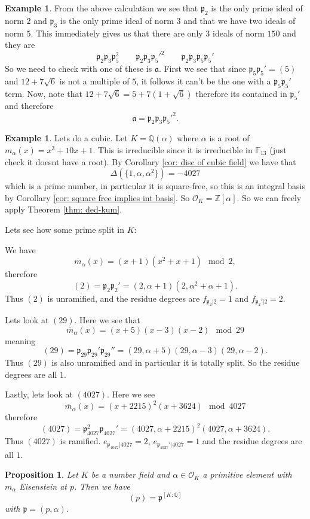 \documentclass[11pt,a4paper]{report}
\theoremstyle{plain}
\newtheorem{prop}[subsection]{Proposition}
\theoremstyle{definition}
\newtheorem{exmp}[subsection]{Example}
\theoremstyle{definition}
\newcommand{\ZZ}{\mathbb{Z}}
\def\FF{\mathbb{F}}
\def\QQ{\mathbb{Q}}
\def\gothp{\mathfrak{p}}
\def \a{\alpha}
\def \OO {\mathcal{O}}
\def \ov{\overline}
\def\gotha{\mathfrak{a}}
\begin{document}
\begin{exmp}
		From the above calculation we see that $\gothp_2$ is the only prime ideal of norm $2$ and $\gothp_3$ is the only prime ideal of norm $3$ and that we have two ideals of norm $5$. This immediately gives us that there are only 3 ideals of norm $150$ and they are \[\gothp_2\gothp_3\gothp_5^2 \qquad \gothp_2\gothp_3\gothp_5'^2 \qquad \gothp_2\gothp_3\gothp_5\gothp_5'\] So we need to check with one of these is $\gotha$. First we see that since $\gothp_5\gothp_5'=(5)$ and $12+7\sqrt{6}$ is not a multiple of $5$, it follows it can't be the one with a $\gothp_5\gothp_5'$ term. Now, note that $12+7\sqrt{6}=5+7(1+\sqrt{6})$ therefore its contained in $\gothp_5'$ and therefore \[\gotha=\gothp_2\gothp_3\gothp_5'^2.\] 
		
		
		
	\end{exmp}
	
	\begin{exmp}
		Lets do a cubic. Let $K=\QQ(\a)$ where $\a$ is a root of $m_\a(x)=x^3+10x+1$. This is irreducible since it is irreducible in $\FF_{13}$ (just check it doesnt have a root).  By Corollary \ref{cor: disc of cubic field} we have that \[\Delta(\{1,\a,\a^2\})=-4027\] which is a prime number, in particular it is square-free, so this is an integral basis by Corollary \ref{cor: square free implies int basis}. So $\OO_K=\ZZ[\a]$. So we can freely apply Theorem \ref{thm: ded-kum}.
		
		Lets see how some prime split in $K$:
		
		We have \[\ov{m}_\a(x)=(x+1)(x^2+x+1) \mod 2,\] therefore \[(2)=\gothp_2\gothp_2'=(2,\a+1)(2,\a^2+\a+1).\] Thus $(2)$ is unramified, and the residue degrees are $f_{\gothp_2|2}=1$ and $f_{\gothp_2'|2}=2$. 
		
		Lets look at $(29)$. Here we see that \[\ov{m}_\a(x)=(x+5)(x-3)(x-2) \mod 29\] meaning \[(29)=\gothp_{29}\gothp_{29}'\gothp_{29}''=(29,\a+5)(29,\a-3)(29,\a-2).\] Thus $(29)$ is also unramified and in particular it is totally split. So the residue degrees are all $1$.
		
		Lastly, lets look at $(4027)$. Here we see \[\ov{m}_\a(x)=(x+2215)^2(x+3624) \mod 4027\] therefore \[(4027)=\gothp_{4027}^2\gothp_{4027}'=(4027,\a+2215)^2(4027,\a+3624).\] Thus $(4027)$ is ramified. $e_{\gothp_{4027}|4027}=2$, $e_{\gothp_{4027}'|4027}=1$ and the residue degrees are all $1$.
		
	\end{exmp}
	\begin{prop}
		Let $K$ be a number field and $\a \in \OO_K$ a primitive element with $m_\a$ Eisenstein at $p$. Then we have \[(p)=\gothp^{[K:\QQ]}\] with $\gothp=(p,\a)$.
	\end{prop}
	
\end{document}
